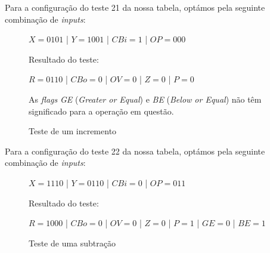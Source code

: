 

Para a configuração do teste 21 da nossa tabela, optámos pela seguinte combinação de \textit{inputs}:
\begin{figure}[h]
    \centering
    \begin{tcolorbox}[halign=flush center,halign lower=flush center,text fill]
        \large $X = 0101$ | $Y = 1001$ | $CBi = 1$ | $OP = 000$
        
        \tcblower
        \large
        Resultado do teste:
        \vspace{2mm}
        
        $R = 0110$ | $CBo = 0$ | $OV = 0$ | $Z = 0$ | $P = 0$
    \end{tcolorbox}
    \begin{marker}
        As \textit{flags} \textit{GE} (\textit{Greater or Equal}) e \textit{BE} (\textit{Below or Equal}) não têm significado para a operação em questão.
    \end{marker}
    \caption{Teste de um incremento}
\end{figure}


Para a configuração do teste 22 da nossa tabela, optámos pela seguinte combinação de \textit{inputs}:
\begin{figure}[h]
    \centering
    \begin{tcolorbox}[halign=flush center,halign lower=flush center,text fill]
        \large $X = 1110$ | $Y = 0110$ | $CBi = 0$ | $OP = 011$
        
        \tcblower
        \large
        Resultado do teste:
        \vspace{2mm}
        
        $R = 1000$ | $CBo = 0$ | $OV = 0$ | $Z = 0$ | $P = 1$ | $GE = 0$ | $BE = 1$
    \end{tcolorbox}
    \caption{Teste de uma subtração}
\end{figure}
\newpage
{}


